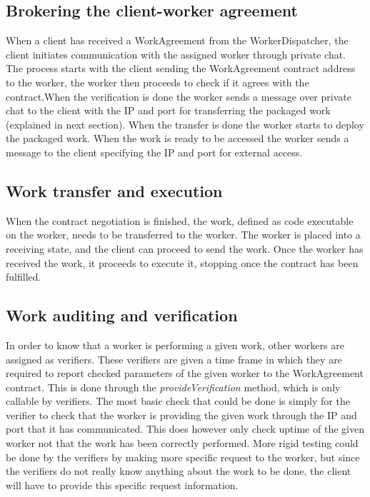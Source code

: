 \subsection{Brokering the client-worker agreement}
\label{sec:res:brokering}
When a client has received a WorkAgreement from the WorkerDispatcher, the client initiates communication with the assigned worker through private chat. The process starts with the client sending the WorkAgreement contract address to the worker, the worker then proceeds to check if it agrees with the contract.When the verification is done the worker sends a message over private chat to the client with the IP and port for transferring the packaged work (explained in next section). When the transfer is done the worker starts to deploy the packaged work. When the work is ready to be accessed the worker sends a message to the client specifying the IP and port for external access.

\subsection{Work transfer and execution}
When the contract negotiation is finished, the work, defined as code executable on the worker, needs to be transferred to the worker. The worker is placed into a receiving state, and the client can proceed to send the work. Once the worker has received the work, it proceeds to execute it, stopping once the contract has been fulfilled. 

\subsection{Work auditing and verification}
\label{sec:res:auditing}
In order to know that a worker is performing a given work, other workers are assigned as verifiers. These verifiers are given a time frame in which they are required to report checked parameters of the given worker to the WorkAgreement contract. This is done through the \textit{provideVerification} method, which is only callable by verifiers. The most basic check that could be done is simply for the verifier to check that the worker is providing the given work through the IP and port that it has communicated. This does however only check uptime of the given worker not that the work has been correctly performed. More rigid testing could be done by the verifiers by making more specific request to the worker, but since the verifiers do not really know anything about the work to be done, the client will have to provide this specific request information.

